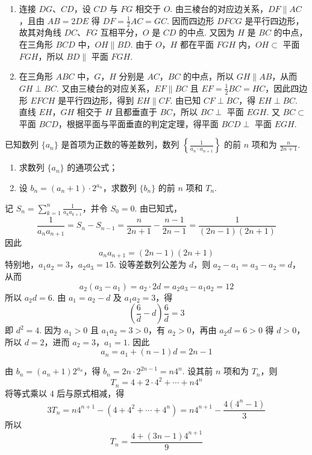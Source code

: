 \begin{solution}
\begin{enumerate}
\item 连接 \(DG\)、\(CD\)，设 \(CD\) 与 \(FG\) 相交于 \(O\). 由三棱台的对应边关系，\(DF\parallel AC\)，且由 \(AB=2DE\) 得 \(DF=\frac12AC=GC\). 因而四边形 \(DFCG\) 是平行四边形，故其对角线 \(DC\)、\(FG\) 互相平分，\(O\) 是 \(CD\) 的中点. 又因为 \(H\) 是 \(BC\) 的中点，在三角形 \(BCD\) 中，\(OH\parallel BD\). 由于 \(O\)，\(H\) 都在平面 \(FGH\) 内，\(OH\subset\) 平面 \(FGH\)，所以 \(BD\parallel\) 平面 \(FGH\).

\item 在三角形 \(ABC\) 中，\(G\)，\(H\) 分别是 \(AC\)，\(BC\) 的中点，所以 \(GH\parallel AB\)，从而 \(GH\perp BC\). 又由三棱台的对应关系，\(EF\parallel BC\) 且 \(EF=\frac12BC=HC\)，因此四边形 \(EFCH\) 是平行四边形，得到 \(EH\parallel CF\). 由已知 \(CF\perp BC\)，得 \(EH\perp BC\). 直线 \(EH\)，\(GH\) 相交于 \(H\) 且都垂直于 \(BC\)，所以 \(BC\perp\) 平面 \(EGH\). 又 \(BC\subset\) 平面 \(BCD\)，根据平面与平面垂直的判定定理，得平面 \(BCD\perp\) 平面 \(EGH\).
\end{enumerate}
\end{solution}

\begin{problem}
已知数列 \(\{a_n\}\) 是首项为正数的等差数列，数列 \(\left\{\frac{1}{a_n \cdot a_{n+1}}\right\}\) 的前 \(n\) 项和为 \(\frac{n}{2n+1}\).

\begin{enumerate}
\item 求数列 \(\{a_n\}\) 的通项公式；
\item 设 \(b_n = (a_n + 1)\cdot 2^{a_n}\)，求数列 \(\{b_n\}\) 的前 \(n\) 项和 \(T_n\).
\end{enumerate}
\end{problem}

\begin{solution}
记 \(S_n=\displaystyle\sum_{k=1}^{n}\frac{1}{a_ka_{k+1}}\)，并令 \(S_0=0\). 由已知式，
\[
\frac{1}{a_na_{n+1}}=S_n-S_{n-1}
=\frac{n}{2n+1}-\frac{n-1}{2n-1}
=\frac{1}{(2n-1)(2n+1)}
\]
因此
\[
a_na_{n+1}=(2n-1)(2n+1)
\]
特别地，\(a_1a_2=3\)，\(a_2a_3=15\). 设等差数列公差为 \(d\)，则 \(a_2-a_1=a_3-a_2=d\)，从而
\[
a_2(a_3-a_1)=a_2\cdot2d=a_2a_3-a_1a_2=12
\]
所以 \(a_2d=6\). 由 \(a_1=a_2-d\) 及 \(a_1a_2=3\)，得
\[
\left(\frac6d-d\right)\frac6d=3
\]
即 \(d^2=4\). 因为 \(a_1>0\) 且 \(a_1a_2=3>0\)，有 \(a_2>0\)，再由 \(a_2d=6>0\) 得 \(d>0\)，所以 \(d=2\)，进而 \(a_2=3\)，\(a_1=1\). 因此
\[
a_n=a_1+(n-1)d=2n-1
\]

由 \(b_n=(a_n+1)2^{a_n}\)，得 \(b_n=2n\cdot2^{2n-1}=n4^n\). 设其前 \(n\) 项和为 \(T_n\)，则
\[
T_n=4+2\cdot4^2+\cdots+n4^n
\]
将等式乘以 \(4\) 后与原式相减，得
\[
3T_n=n4^{n+1}-\left(4+4^2+\cdots+4^n\right)
=n4^{n+1}-\frac{4(4^n-1)}{3}
\]
所以
\[
T_n=\frac{4+(3n-1)4^{n+1}}{9}
\]
\end{solution}

